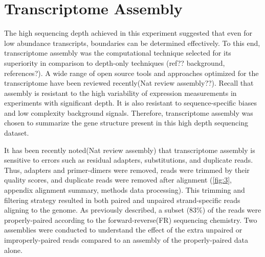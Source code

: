 

\chapter{Transcriptome Assembly}
The high sequencing depth achieved in this experiment suggested that even for low abundance transcripts, boundaries can be determined effectively. To this end, transcriptome assembly was the computational technique selected for its superiority in comparison to depth-only techniques (ref?? background, references?). A wide range of open source tools and approaches optimized for the transcriptome have been reviewed recently(Nat review assembly??). Recall that assembly is resistant to the high variability of expression measurements in experiments with significant depth. It is also resistant to sequence-specific biases and low complexity background signals. Therefore, transcriptome assembly was chosen to summarize the gene structure present in this high depth sequencing dataset.

It has been recently noted(Nat review assembly) that transcriptome assembly is sensitive to errors such as residual adapters, substitutions, and duplicate reads. Thus, adapters and primer-dimers were removed, reads were trimmed by their quality scores, and duplicate reads were removed after alignment (\ref{fig:3}, appendix alignment summary, methods data processing). This trimming and filtering strategy resulted in both paired and unpaired strand-specific reads aligning to the genome. As previously described, a subset (83\%) of the reads were properly-paired according to the forward-reverse(FR) sequencing chemistry. Two assemblies were conducted to understand the effect of the extra unpaired or improperly-paired reads compared to an assembly of the properly-paired data alone.








